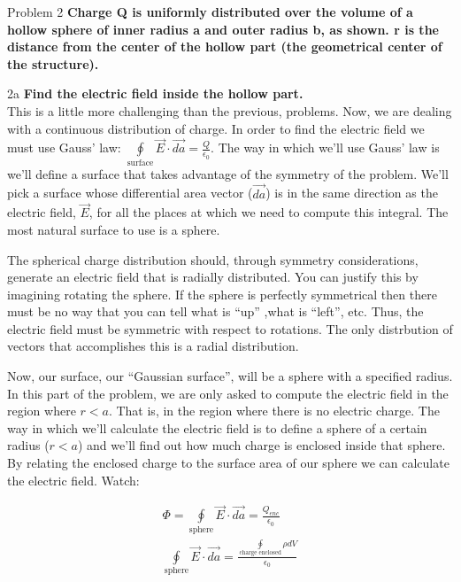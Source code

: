 \begin{homeworkProblem}{Problem 2}
    \textbf{Charge Q is uniformly distributed over the volume of a
    hollow sphere of inner radius a and outer radius b, as shown. r is
    the distance from the center of the hollow part (the geometrical
    center of the structure).}
    \begin{homeworkSection}{2a}
        \textbf{Find the electric field inside the hollow part.}
        \\

        This is a little more challenging than the previous, problems.
        Now, we are dealing with a continuous distribution of charge. In
        order to find the electric field we must use Gauss' law:
        $\oint\limits_{\text{surface}}
        \vec{E}\cdot\vec{da} = \frac{Q}{\epsilon_0}$. The way in which
        we'll use Gauss' law is we'll define a surface that takes
        advantage of the symmetry of the problem. We'll pick a surface
        whose differential area vector ($\vec{da}$) is in the same
        direction as the electric field, $\vec{E}$, for all the places
        at which we need to compute this integral. The most natural
        surface to use is a sphere.
        
        The spherical charge distribution should, through symmetry
        considerations, generate an electric field that is radially
        distributed. You can justify this by imagining rotating the
        sphere. If the sphere is perfectly symmetrical then there must
        be no way that you can tell what is ``up'' ,what is ``left'',
        etc. Thus, the electric field must be symmetric with respect to
        rotations. The only distrbution of vectors that accomplishes
        this is a radial distribution.
        
        Now, our surface, our ``Gaussian surface'', will be a sphere
        with a specified radius. In this part of the problem, we are
        only asked to compute the electric field in the region where
        $r<a$. That is, in the region where there is no electric charge.
        The way in which we'll calculate the electric field is to define
        a sphere of a certain radius ($r<a$) and we'll find out how much
        charge is enclosed inside that sphere. By relating the enclosed
        charge to the surface area of our sphere we can calculate the
        electric field. Watch:

        \begin{align}
            \label{}
            \Phi = \oint\limits_{\text{sphere}} \vec{E}\cdot\vec{da} =
            \frac{Q_{enc}}{\epsilon_0} \nonumber \\
            \oint\limits_{\text{sphere}} \vec{E}\cdot\vec{da} =
            \frac{\oint\limits_{\text{charge enclosed}}\rho dV}{\epsilon_0}
        \end{align}


\end{homeworkSection}
\end{homeworkProblem}
